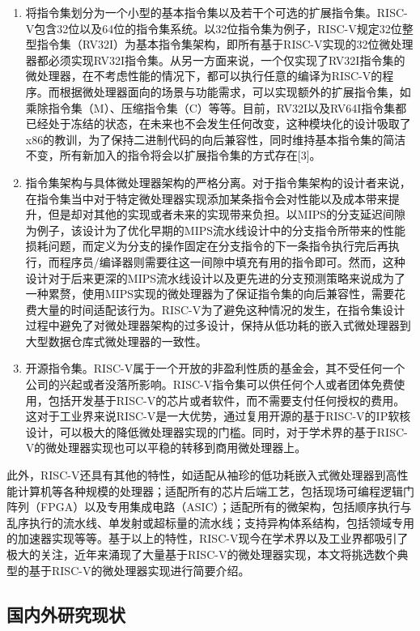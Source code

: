 \begin{enumerate}
	\item 将指令集划分为一个小型的基本指令集以及若干个可选的扩展指令集。RISC-V包含32位以及64位的指令集系统。以32位指令集为例子，RISC-V规定32位整型指令集（RV32I）为基本指令集架构，即所有基于RISC-V实现的32位微处理器都必须实现RV32I指令集。从另一方面来说，一个仅实现了RV32I指令集的微处理器，在不考虑性能的情况下，都可以执行任意的编译为RISC-V的程序。而根据微处理器面向的场景与功能需求，可以实现额外的扩展指令集，如乘除指令集（M）、压缩指令集（C）等等。目前，RV32I以及RV64I指令集都已经处于冻结的状态，在未来也不会发生任何改变，这种模块化的设计吸取了x86的教训，为了保持二进制代码的向后兼容性，同时维持基本指令集的简洁不变，所有新加入的指令将会以扩展指令集的方式存在[3]。
	\item 指令集架构与具体微处理器架构的严格分离。对于指令集架构的设计者来说，在指令集当中对于特定微处理器实现添加某条指令会对性能以及成本带来提升，但是却对其他的实现或者未来的实现带来负担。以MIPS的分支延迟间隙为例子，该设计为了优化早期的MIPS流水线设计中的分支指令所带来的性能损耗问题，而定义为分支的操作固定在分支指令的下一条指令执行完后再执行，而程序员/编译器则需要往这一间隙中填充有用的指令即可。然而，这种设计对于后来更深的MIPS流水线设计以及更先进的分支预测策略来说成为了一种累赘，使用MIPS实现的微处理器为了保证指令集的向后兼容性，需要花费大量的时间适配该行为。RISC-V为了避免这种情况的发生，在指令集设计过程中避免了对微处理器架构的过多设计，保持从低功耗的嵌入式微处理器到大型数据仓库式微处理器的一致性。
	\item 开源指令集。RISC-V属于一个开放的非盈利性质的基金会，其不受任何一个公司的兴起或者没落所影响。RISC-V指令集可以供任何个人或者团体免费使用，包括开发基于RISC-V的芯片或者软件，而不需要支付任何授权的费用。这对于工业界来说RISC-V是一大优势，通过复用开源的基于RISC-V的IP软核设计，可以极大的降低微处理器实现的门槛。同时，对于学术界的基于RISC-V的微处理器实现也可以平稳的转移到商用微处理器上。
\end{enumerate}

此外，RISC-V还具有其他的特性，如适配从袖珍的低功耗嵌入式微处理器到高性能计算机等各种规模的处理器；适配所有的芯片后端工艺，包括现场可编程逻辑门阵列（FPGA）以及专用集成电路（ASIC）；适配所有的微架构，包括顺序执行与乱序执行的流水线、单发射或超标量的流水线；支持异构体系结构，包括领域专用的加速器实现等等。基于以上的特性，RISC-V现今在学术界以及工业界都吸引了极大的关注，近年来涌现了大量基于RISC-V的微处理器实现，本文将挑选数个典型的基于RISC-V的微处理器实现进行简要介绍。

\subsection{国内外研究现状}

